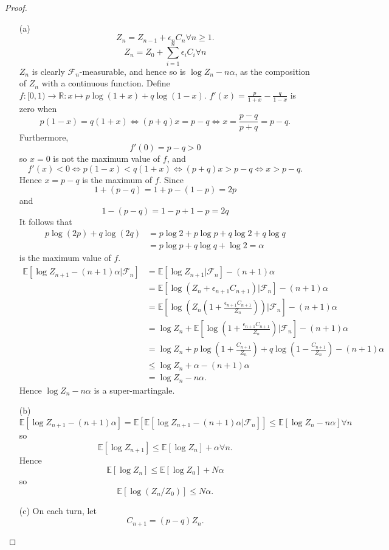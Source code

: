 \documentclass{article}
\begin{document}
\begin{proof}
\begin{enumerate}
\item[(a)] \[Z_n=Z_{n-1}+\epsilon_nC_n\forall n\geq1.\]\[Z_n=Z_0+\sum_{i=1}^n\epsilon_iC_i\forall n\]$Z_n$ is clearly $\mathcal{F}_n$-measurable, and hence so is $\log Z_n-n\alpha$, as the composition of $Z_n$ with a continuous function. Define $f:[0,1)\to\mathbb{R}:x\mapsto p\log(1+x)+q\log(1-x)$. $f'(x)=\frac{p}{1+x}-\frac{q}{1-x}$ is zero when \[p(1-x)=q(1+x)\iff (p+q)x=p-q\iff x=\frac{p-q}{p+q}=p-q.\] Furthermore,\[f'(0)=p-q>0\] so $x=0$ is not the maximum value of $f$, and \[f'(x)<0\iff p(1-x)<q(1+x)\iff (p+q)x>p-q\iff x>p-q.\] Hence $x=p-q$ is the maximum of $f$. Since \[1+(p-q)=1+p-(1-p)=2p\] and \[1-(p-q)=1-p+1-p=2q\] It follows that \begin{align*}p\log(2p)+q\log(2q)&=p\log 2+p\log p + q\log 2 +q\log q\\&=p\log p+q\log q+\log 2=\alpha\end{align*} is the maximum value of $f$.\begin{align*}
\mathbb{E}[\log Z_{n+1}-(n+1)\alpha|\mathcal{F}_n]&=\mathbb{E}[\log Z_{n+1}|\mathcal{F}_n]-(n+1)\alpha\\&=\mathbb{E}[\log(Z_n+\epsilon_{n+1}C_{n+1})|\mathcal{F}_n]-(n+1)\alpha\\&=\mathbb{E}\left[\log\left(Z_n\left(1+\frac{\epsilon_{n+1}C_{n+1}}{Z_n}\right)\right)|\mathcal{F}_n\right]-(n+1)\alpha\\&=\log Z_n+\mathbb{E}\left[\log\left(1+\frac{\epsilon_{n+1}C_{n+1}}{Z_n}\right)|\mathcal{F}_n\right]-(n+1)\alpha\\&=\log Z_n+p\log\left(1+\frac{C_{n+1}}{Z_n}\right)+q\log\left(1-\frac{C_{n+1}}{Z_n}\right)-(n+1)\alpha\\&\leq\log Z_n+\alpha-(n+1)\alpha\\&=\log Z_n-n\alpha.
\end{align*}Hence $\log Z_n-n\alpha$ is a super-martingale.
\item[(b)] \[\mathbb{E}[\log Z_{n+1}-(n+1)\alpha]=\mathbb{E}[\mathbb{E}[\log Z_{n+1}-(n+1)\alpha|\mathcal{F}_n]]\leq\mathbb{E}[\log Z_n-n\alpha]\forall n\] so\[\mathbb{E}[\log Z_{n+1}]\leq \mathbb{E}[\log Z_n]+\alpha\forall n.\] Hence\[\mathbb{E}[\log Z_n]\leq \mathbb{E}[\log Z_0]+N\alpha\] so\[\mathbb{E}[\log(Z_n/Z_0)]\leq N\alpha.\]
\item[(c)] On each turn, let \[C_{n+1}=(p-q)Z_n.\]
\end{enumerate}
\end{proof}
\end{document}
